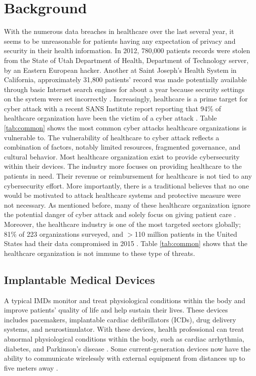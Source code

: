 \documentclass{IEEEtran}
\begin{document}
\section{Background}
With the numerous data breaches in healthcare over the last several year, it seems to be unreasonable for patients having any expectation of privacy and security in their health information. In 2012, 780,000 patients records were stolen from the State of Utah Department of Health, Department of Technology server, by an Eastern European hacker. Another at Saint Joseph's Health System in California, approximately 31,800 patients' record was made potentially available through basic Internet search engines for about a year because security settings on the system were set incorrectly \cite{murphy2015cybersecurity}. Increasingly, healthcare is a prime target for cyber attack with a recent SANS Institute report reporting that 94\% of healthcare organization have been the victim of a cyber attack \cite{williams2015cybersecurity}. Table \ref{tab:common} shows the most common cyber attacks healthcare organizations is vulnerable to. The vulnerability of healthcare to cyber attack reflects a combination of factors, notably limited resources, fragmented governance, and cultural behavior. Most healthcare organization exist to provide cybersecurity within their devices. The industry more focuses on providing healthcare to the patients in need. Their revenue or reimbursement for healthcare is not tied to any cybersecurity effort. More importantly, there is a traditional believes that no one would be motivated to attack healthcare systems and protective measure were not necessary. As mentioned before, many of these healthcare organization ignore the potential danger of cyber attack and solely focus on giving patient care \cite{coventry2018cybersecurity}. Moreover, the healthcare industry is one of the most targeted sectors globally; 81\% of 223 organizations surveyed, and $>$110 million patients in the United States had their data compromised in 2015 \cite{martin2017cybersecurity}. Table \ref{tab:common} shows that the healthcare organization is not immune to these type of threats. 
\subsection{Implantable Medical Devices}
A typical IMDs monitor and treat physiological conditions within the body and improve patients' quality of life and help sustain their lives.  These devices includes pacemakers, implantable cardiac defibrillators (ICDs), drug delivery systems, and neurostimulator. With these devices, health professional can treat abnormal physiological conditions within the body, such as cardiac arrhythmia, diabetes, and Parkinson's disease \cite{halperin2008security}. Some current-generation devices now have the ability to communicate wirelessly with external equipment from distances up to five meters away \cite{denning2010patients}. 
\end{document}
